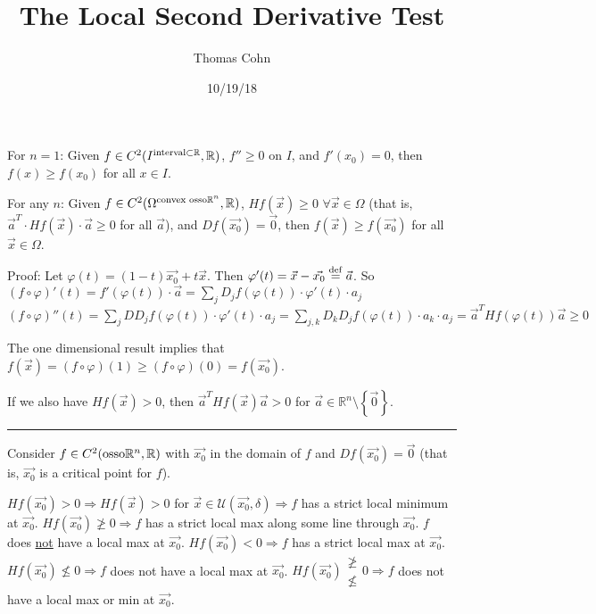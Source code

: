 \documentclass[10pt,letterpaper]{article}
\author{Thomas Cohn}
\title{The Local Second Derivative Test}
\date{10/19/18} %
\newcommand{\n}{\hfill\break}
\newcommand{\ptxt}[1]{\textrm{\textnormal{#1}}}
\newcommand{\pageline}{\noindent\rule{\textwidth}{0.1pt}}
\newcommand{\set}[1]{\left\{#1\right\}}
\newcommand{\reals}{\mathbb{R}}
\newcommand{\R}{\reals}
\newcommand{\of}{\circ}
\newcommand{\tpose}{^{T}}
\newcommand{\uball}{\mathcal{U}}
\begin{document}
\maketitle
\setlength\RaggedRightParindent{\parindent}
\RaggedRight

\par\noindent For $n=1$: Given $f\in{}C^{2}(I^{\ptxt{interval}\subset\R},\R)$, $f''\ge{}0$ on $I$, and $f'(x_{0})=0$, then $f(x)\ge{}f(x_{0})$ for all $x\in{}I$.\n

\par\noindent For any $n$: Given $f\in{}C^{2}(\Omega^{\ptxt{convex osso}\R^{n}},\R)$, $Hf(\vec{x})\ge{}0$ $\forall\vec{x}\in\Omega$ (that is, $\vec{a}\tpose\cdot{}Hf(\vec{x})\cdot\vec{a}\ge{}0$ for all $\vec{a}$), and $Df(\vec{x_{0}})=\vec{0}$, then $f(\vec{x})\ge{}f(\vec{x_{0}})$ for all $\vec{x}\in\Omega$.\n

\par\noindent Proof: Let $\varphi(t)=(1-t)\vec{x_{0}}+t\vec{x}$. Then $\varphi'(t)=\vec{x}-\vec{x_{0}}\overset{\ptxt{def}}{=}\vec{a}$.\n
So $(f\of\varphi)'(t)=f'(\varphi(t))\cdot\vec{a}=\sum_{j}D_{j}f(\varphi(t))\cdot\varphi'(t)\cdot{}a_{j}$\n
$(f\of\varphi)''(t)=\sum_{j}DD_{j}f(\varphi(t))\cdot\varphi'(t)\cdot{}a_{j}=\sum_{j,k}D_{k}D_{j}f(\varphi(t))\cdot{}a_{k}\cdot{}a_{j}=\vec{a}\tpose{}Hf(\varphi(t))\vec{a}\ge{}0$\n

\par\noindent The one dimensional result implies that $f(\vec{x})=(f\of\varphi)(1)\ge(f\of\varphi)(0)=f(\vec{x_{0}})$.\n

\par\noindent If we also have $Hf(\vec{x})>0$, then $\vec{a}\tpose{}Hf(\vec{x})\vec{a}>0$ for $\vec{a}\in\R^{n}\setminus\set{\vec{0}}$.\n

\pageline

\par\noindent Consider $f\in{}C^{2}(\ptxt{osso}\R^{n},\R)$ with $\vec{x_{0}}$ in the domain of $f$ and $Df(\vec{x_{0}})=\vec{0}$ (that is, $\vec{x_{0}}$ is a critical point for $f$).\n

\par\noindent $Hf(\vec{x_{0}})>0\Rightarrow{}Hf(\vec{x})>0$ for $\vec{x}\in\uball(\vec{x_{0}},\delta)\Rightarrow{}f$ has a strict local minimum at $\vec{x_{0}}$.\n
$Hf(\vec{x_{0}})\not\ge{}0\Rightarrow{}f$ has a strict local max along some line through $\vec{x_{0}}$. $f$ does \underline{not} have a local max at $\vec{x_{0}}$.\n
$Hf(\vec{x_{0}})<0\Rightarrow{}f$ has a strict local max at $\vec{x_{0}}$.\n
$Hf(\vec{x_{0}})\not\le{}0\Rightarrow{}f$ does not have a local max at $\vec{x_{0}}$.\n
$Hf(\vec{x_{0}})\begin{array}{c}\not\ge\\ \not\le\end{array}0\Rightarrow{}f$ does not have a local max or min at $\vec{x_{0}}$.\n
\end{document}
